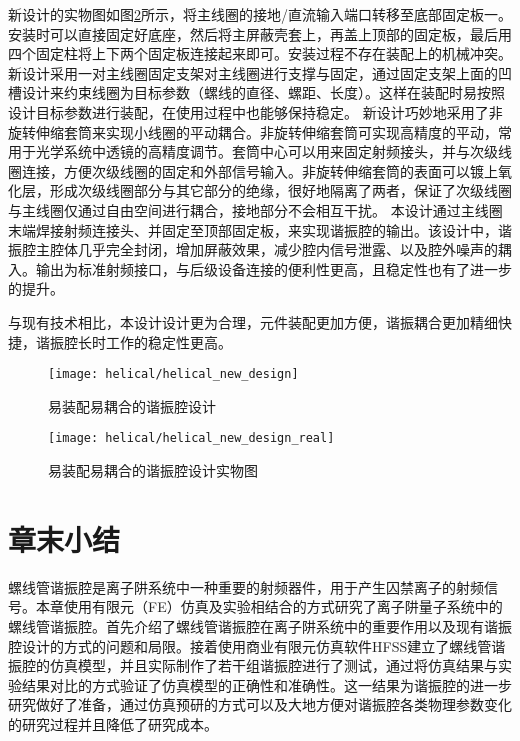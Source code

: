 新设计的实物图如图\ref{fig:helical_new_design_real}所示，将主线圈的接地/直流输入端口转移至底部固定板一。安装时可以直接固定好底座，然后将主屏蔽壳套上，再盖上顶部的固定板，最后用四个固定柱将上下两个固定板连接起来即可。安装过程不存在装配上的机械冲突。
新设计采用一对主线圈固定支架对主线圈进行支撑与固定，通过固定支架上面的凹槽设计来约束线圈为目标参数（螺线的直径、螺距、长度）。这样在装配时易按照设计目标参数进行装配，在使用过程中也能够保持稳定。
新设计巧妙地采用了非旋转伸缩套筒来实现小线圈的平动耦合。非旋转伸缩套筒可实现高精度的平动，常用于光学系统中透镜的高精度调节。套筒中心可以用来固定射频接头，并与次级线圈连接，方便次级线圈的固定和外部信号输入。非旋转伸缩套筒的表面可以镀上氧化层，形成次级线圈部分与其它部分的绝缘，很好地隔离了两者，保证了次级线圈与主线圈仅通过自由空间进行耦合，接地部分不会相互干扰。
本设计通过主线圈末端焊接射频连接头、并固定至顶部固定板，来实现谐振腔的输出。该设计中，谐振腔主腔体几乎完全封闭，增加屏蔽效果，减少腔内信号泄露、以及腔外噪声的耦入。输出为标准射频接口，与后级设备连接的便利性更高，且稳定性也有了进一步的提升。

与现有技术相比，本设计设计更为合理，元件装配更加方便，谐振耦合更加精细快捷，谐振腔长时工作的稳定性更高。
\begin{figure}
    \centering
    \caption[易装配易耦合的谐振腔设计]{易装配易耦合的谐振腔设计\label{fig:helical_new_design}}
    \texttt{[image: helical/helical\_new\_design]}
\end{figure}

\begin{figure}
    \centering
    \caption[易装配易耦合的谐振腔设计实物图]{易装配易耦合的谐振腔设计实物图\label{fig:helical_new_design_real}}
    \texttt{[image: helical/helical\_new\_design\_real]}
\end{figure}







\newpage
\section[章末小结]{章末小结}
螺线管谐振腔是离子阱系统中一种重要的射频器件，用于产生囚禁离子的射频信号。本章使用有限元（FE）仿真及实验相结合的方式研究了离子阱量子系统中的螺线管谐振腔。首先介绍了螺线管谐振腔在离子阱系统中的重要作用以及现有谐振腔设计的方式的问题和局限。接着使用商业有限元仿真软件HFSS建立了螺线管谐振腔的仿真模型，并且实际制作了若干组谐振腔进行了测试，通过将仿真结果与实验结果对比的方式验证了仿真模型的正确性和准确性。这一结果为谐振腔的进一步研究做好了准备，通过仿真预研的方式可以及大地方便对谐振腔各类物理参数变化的研究过程并且降低了研究成本。

